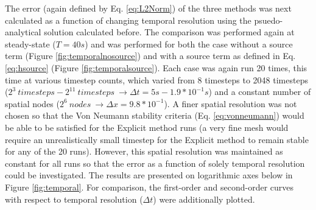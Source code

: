 \documentclass[10pt, letter, showtrims]{extarticle}
\begin{document}
		\noindent
		The error (again defined by Eq. \ref{eq:L2Norm}) of the three methods was next calculated as a function of changing temporal resolution using the psuedo-analytical solution calculated before. The comparison was performed again at steady-state ($T = 40 s$) and was performed for both the case without a source term (Figure \ref{fig:temporalnosource}) and with a source term as defined in Eq. \ref{eq:hsource} (Figure \ref{fig:temporalsource}). Each case was again run 20 times, this time at various timestep counts, which varied from 8 timesteps to 2048 timesteps ($2^{3}\ timesteps - 2^{11}\ timesteps\ \rightarrow	\Delta t = 5 s - 1.9 * 10^{-1} s$) and a constant number of spatial nodes ($2^{6}\ nodes\ \rightarrow \Delta x = 9.8*10^{-1} $). A finer spatial resolution was not chosen so that the Von Neumann stability criteria (Eq. \ref{eq:vonneumann}) would be able to be satisfied for the Explicit method runs (a very fine mesh would require an unrealistically small timestep for the Explicit method to remain stable for any of the 20 runs). However, this spatial resolution was maintained as constant for all runs so that the error as a function of solely temporal resolution could be investigated. The results are presented on logarithmic axes below in Figure \ref{fig:temporal}. For comparison, the first-order and second-order curves with respect to temporal resolution ($\Delta t$) were additionally plotted.
		
\end{document}
